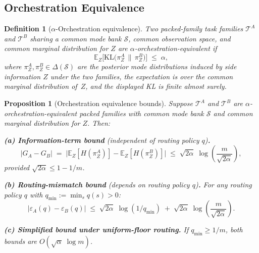 \documentclass[10pt]{article}
\theoremstyle{paperplain}
\newtheorem{proposition}[theorem]{Proposition}
\theoremstyle{paperdefinition}
\newtheorem{definition}[theorem]{Definition}
\theoremstyle{paperremark}
\newcommand{\KL}{\mathrm{KL}}
\newcommand{\E}{\mathbb{E}}
\newcommand{\cS}{\mathcal{S}}
\newcommand{\cT}{\mathcal{T}}
\begin{document}
\subsection{Orchestration Equivalence}
\label{subsec:orch-equiv}

\begin{definition}[$\alpha$-Orchestration equivalence]
\label{def:orch-equiv}
Two packed-family task families $\cT^A$ and $\cT^B$ sharing a common mode bank $\cS$, common observation space, and common marginal distribution for $Z$ are \emph{$\alpha$-orchestration-equivalent} if
\begin{equation}
\label{eq:orch-equiv-def}
\E_Z\!\bigl[\KL\!\bigl(\pi^A_Z \,\big\|\, \pi^B_Z\bigr)\bigr] \;\le\; \alpha,
\end{equation}
where $\pi^A_Z, \pi^B_Z \in \Delta(\cS)$ are the posterior mode distributions induced by side information $Z$ under the two families, the expectation is over the common marginal distribution of~$Z$, and the displayed KL is finite almost surely.
\end{definition}

\begin{proposition}[Orchestration equivalence bounds]
\label{prop:orch-equiv-bound}
Suppose $\cT^A$ and $\cT^B$ are $\alpha$-orchestration-equivalent packed families with common mode bank $\cS$ and common marginal distribution for $Z$.
Then:

\medskip
\noindent\textbf{(a) Information-term bound} (independent of routing policy $q$)\textbf{.}
\begin{equation}
\label{eq:orch-info-bound}
|G_A - G_B|
\;=\;
\bigl|\E_Z[H(\pi^A_Z)] - \E_Z[H(\pi^B_Z)]\bigr|
\;\le\;
\sqrt{2\alpha}\;\log\!\left(\frac{m}{\sqrt{2\alpha}}\right),
\end{equation}
provided $\sqrt{2\alpha} \le 1 - 1/m$.

\medskip
\noindent\textbf{(b) Routing-mismatch bound} (depends on routing policy $q$)\textbf{.}
For any routing policy $q$ with $q_{\min} := \min_s q(s) > 0$:
\begin{equation}
\label{eq:orch-routing-bound}
|\varepsilon_A(q) - \varepsilon_B(q)|
\;\le\;
\sqrt{2\alpha}\;\log(1/q_{\min})
\;+\;
\sqrt{2\alpha}\;\log\!\left(\frac{m}{\sqrt{2\alpha}}\right).
\end{equation}

\medskip
\noindent\textbf{(c) Simplified bound under uniform-floor routing.}
If $q_{\min} \ge 1/m$, both bounds are $O(\sqrt{\alpha}\;\log m)$.
\end{proposition}
\end{document}
